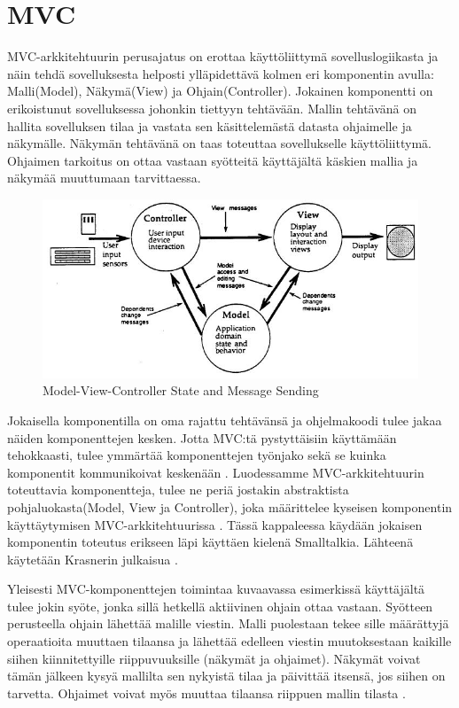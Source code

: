 \documentclass[finnish,utf8,nonumbib,palatino,kandi]{gradu2}
\begin{document}
\section {MVC}
MVC-arkkitehtuurin perusajatus on erottaa käyttöliittymä sovelluslogiikasta ja
näin tehdä sovelluksesta helposti ylläpidettävä kolmen eri komponentin avulla:
Malli(Model), Näkymä(View) ja Ohjain(Controller). Jokainen komponentti on
erikoistunut sovelluksessa johonkin tiettyyn tehtävään. Mallin tehtävänä on
hallita sovelluksen tilaa ja vastata sen käsittelemästä datasta ohjaimelle ja näkymälle.
Näkymän tehtävänä on taas toteuttaa sovellukselle käyttöliittymä. Ohjaimen tarkoitus on ottaa
vastaan syötteitä käyttäjältä käskien mallia ja näkymää muuttumaan tarvittaessa.

\begin{figure}[h]
\centering
\includegraphics[scale=0.85]{krasner_mvc.jpg}
\caption{Model-View-Controller State and Message Sending \cite[s. 5]{Krasner:desc}}
\end{figure}

Jokaisella komponentilla on oma rajattu tehtävänsä ja ohjelmakoodi tulee jakaa näiden komponenttejen kesken. Jotta MVC:tä pystyttäisiin käyttämään
tehokkaasti, tulee ymmärtää komponenttejen työnjako sekä se kuinka komponentit kommunikoivat keskenään \cite{Burbeck}.  Luodessamme MVC-arkkitehtuurin
toteuttavia komponentteja, tulee ne periä jostakin abstraktista pohjaluokasta(Model, View ja Controller), joka määrittelee kyseisen komponentin käyttäytymisen MVC-arkkitehtuurissa  \cite[s. 5]{Krasner:desc}.  Tässä kappaleessa käydään jokaisen komponentin toteutus erikseen läpi käyttäen kielenä Smalltalkia. Lähteenä käytetään Krasnerin julkaisua \cite{Krasner:desc}.

Yleisesti MVC-komponenttejen toimintaa kuvaavassa esimerkissä käyttäjältä tulee jokin syöte, jonka sillä hetkellä aktiivinen ohjain ottaa vastaan. Syötteen perusteella ohjain lähettää malille viestin. Malli puolestaan
tekee sille määrättyjä operaatioita muuttaen tilaansa ja lähettää edelleen viestin muutoksestaan kaikille siihen kiinnitettyille riippuvuuksille (näkymät ja ohjaimet). Näkymät
voivat tämän jälkeen kysyä mallilta sen nykyistä tilaa ja päivittää itsensä, jos siihen on tarvetta. Ohjaimet voivat myös muuttaa tilaansa riippuen mallin tilasta \cite[s. 4]{Krasner:desc}.
\end{document}
